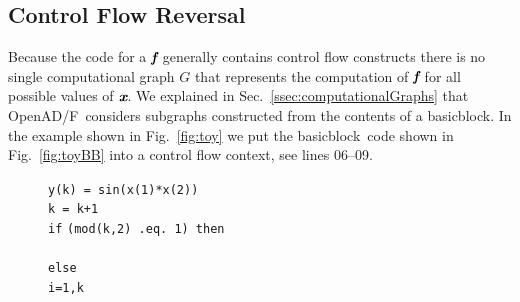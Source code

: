 \documentclass[11pt]{article}
\newcommand{\basicblock}{basicblock}
\newcommand{\OpenADF}{OpenAD/F}
\newcommand{\bmf}{\mbox{\bf\em f}}
\newcommand{\bmx}{\mbox{\bf\em x}}
\newcommand{\refsec}[1]{{Sec.~\ref{#1}}}
\newcommand{\reffig}[1]{{Fig.~\ref{#1}}}
\begin{document}
\subsection{Control Flow Reversal} \label{ssec:cfReversal}
Because the code for a $\bmf$ generally contains control flow constructs there is no 
single  computational graph 
$G$ that represents the computation of $\bmf$ for all possible values of $\bmx$.
We explained in \refsec{ssec:computationalGraphs} that \OpenADF\ considers subgraphs constructed 
from the contents of a \basicblock.
In the example shown in \reffig{fig:toy} we put the \basicblock\ code shown in 
\reffig{fig:toyBB} into a control flow context, see lines 06--09.
\begin{figure}
\begin{center}
\begin{minipage}{.5\textwidth}
\begin{tabbing}
\hspace{.6cm}{\footnotesize \bf 00}\hspace{.5cm} {\tt y(k) = sin(x(1)*x(2))} \\
\hspace{.6cm}{\footnotesize \bf 01}\hspace{.5cm} {\tt k    = k+1} \\
\hspace{.6cm}{\footnotesize \bf 02}\hspace{.5cm} {\tt if} \={\tt (mod(k,2) .eq. 1) then } \\
\hspace{.6cm}{\footnotesize \bf 03}\hspace{.5cm}   \\
\hspace{.6cm}{\footnotesize \bf 04}\hspace{.5cm} {\tt else } \\
\hspace{.6cm}{\footnotesize \bf 05}\hspace{.5cm}  \={\tt i=1,k } \\
\hspace{.6cm}{\footnotesize \bf 06}\hspace{.5cm} \> \\
\hspace{.6cm}{\footnotesize \bf 07}\hspace{.5cm} \> \\
\hspace{.6cm}{\footnotesize \bf 08}\hspace{.5cm} \> \\

\end{tabbing}
\end{minipage}
\end{center}
\end{figure}
\end{document}
